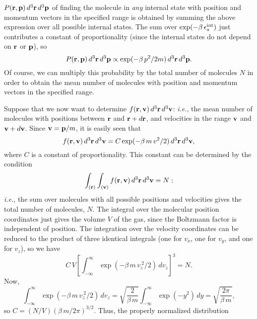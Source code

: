 $P({\bf r}, {\bf p}) \,d^3{\bf r}\,d^3{\bf p}$
of finding the molecule in {\em any}\/ internal state
with position and momentum vectors in the
specified range 
is obtained by summing the above expression over all possible internal states.
The sum over $\exp(-\beta\, \epsilon^{\rm int}_s)$ just contributes a constant of
proportionality (since the internal states do not depend on ${\bf r}$ or
${\bf p}$), so
\begin{equation}
P({\bf r}, {\bf p}) \,d^3{\bf r}\,d^3{\bf p} \propto \exp(-\beta \,p^2/2m)
\,d^3{\bf r}\,d^3{\bf p}.
\end{equation}
Of course, we can multiply this probability by the total number of molecules
$N$ in order 
to obtain the mean number of molecules with position and momentum vectors in the
specified range. 

Suppose that we now want to determine
 $f({\bf r}, {\bf v})\,d^3{\bf r}\,d^3{\bf v}$: {\em i.e.}, 
the mean number of molecules with positions between ${\bf r}$ and ${\bf r} +
d{\bf r}$, and velocities in the range ${\bf v}$ and ${\bf v}+d{\bf v}$. 
Since ${\bf v} = {\bf p}/m$,  it is easily seen that
\begin{equation}
f({\bf r}, {\bf v})\,d^3{\bf r}\,d^3{\bf v} = C \exp(-\beta \, m \,v^2/2)\,
d^3{\bf r}\,d^3{\bf v},
\end{equation}
where $C$ is a constant of proportionality. This constant can be determined by
the condition
\begin{equation}
\int_{({\bf r})} \int_{({\bf v})}  f({\bf r}, {\bf v})\,d^3{\bf r}\,d^3{\bf v} = N:
\end{equation}
{\em i.e.}, the sum over molecules with all possible positions and velocities gives
the total number of molecules, $N$. The integral over the molecular position
coordinates just gives the volume $V$ of the gas, since the Boltzmann factor
is independent of position. The integration over the velocity coordinates can
be reduced to the product of three identical integrals (one for $v_x$, one
for $v_y$, and one for $v_z$), so we have
\begin{equation}
C\, V \left[\int_{-\infty}^{\infty} \exp(-\beta\, m\,v_z^{~2}/2)\, dv_z\right]^3
= N.
\end{equation}
Now,
\begin{equation}
\int_{-\infty}^{\infty} \exp(-\beta\, m\,v_z^{~2}/2)\, dv_z = \sqrt{\frac{2}{\beta\, m}}
\int_{-\infty}^{\infty} \exp(-y^2)\, dy = \sqrt{\frac{2\pi}{\beta\, m}},
\end{equation}
so
$ C =(N/V) (\beta\, m / 2\pi)^{3/2}$. Thus, the properly normalized distribution
